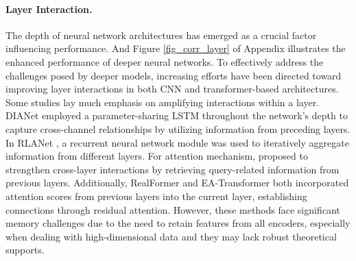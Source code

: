 \paragraph{Layer Interaction.} The depth of neural network architectures has emerged as a crucial factor influencing performance. And Figure \ref{fig_corr_layer} of Appendix illustrates the enhanced performance of deeper neural networks. To effectively address the challenges posed by deeper models, increasing efforts have been directed toward improving layer interactions in both CNN and transformer-based architectures. Some studies \citep{hu2018squeeze,woo2018cbam,dosovitskiy2020image} lay much emphasis on amplifying interactions within a layer. DIANet \citep{huang2018denselyconnectedconvolutionalnetworks} employed a parameter-sharing LSTM throughout the network's depth to capture cross-channel relationships by utilizing information from preceding layers. In RLANet \citep{zhao2021recurrence}, a recurrent neural network module was used to iteratively aggregate information from different layers. For attention mechanism, \cite{fang2023cross} proposed to strengthen cross-layer interactions by retrieving query-related information from previous layers. Additionally, RealFormer \citep{he2020realformer} and EA-Transformer \citep{wang2021evolving} both incorporated attention scores from previous layers into the current layer, establishing connections through residual attention. However, these methods face significant memory challenges due to the need to retain features from all encoders, especially when dealing with high-dimensional data and they may lack robust theoretical supports.

